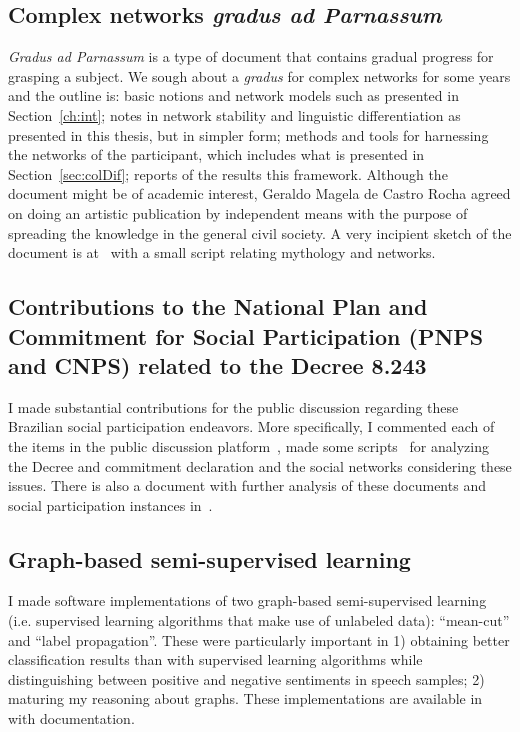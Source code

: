 \begin{apendicesenv}
\subsection{Complex networks \emph{gradus ad Parnassum}}
\emph{Gradus ad Parnassum} is a type of document that contains gradual progress for grasping a subject.
We sough about a \emph{gradus} for complex networks for some years and the outline is:
basic notions and network models such as presented in Section~\ref{ch:int};
notes in network stability and linguistic differentiation as presented in this thesis, but in simpler form;
methods and tools for harnessing the networks of the participant, which includes what is presented in Section~\ref{sec:colDif};
reports of the results this framework.
Although the document might be of academic interest,
Geraldo Magela de Castro Rocha agreed on doing an artistic publication by independent means
with the purpose of spreading the knowledge in the general civil society.
A very incipient sketch of the document is at~\cite{gradus}
with a small script relating mythology and networks.

\subsection{Contributions to the National Plan and Commitment for Social Participation (PNPS and CNPS) related to the Decree 8.243}
I made substantial contributions for the public discussion regarding these Brazilian social participation
endeavors.
More specifically, I commented each of the items in the public discussion platform~\cite{participaPNPS},
made some scripts~\cite{analisePNPS,pcPS} for analyzing the Decree and commitment declaration and the social networks considering these issues.
There is also a document with further analysis of these documents and social participation instances in~\cite{lmPS}.

\subsection{Graph-based semi-supervised learning}
I made software implementations of two graph-based semi-supervised learning
(i.e. supervised learning algorithms that make use of unlabeled data):
``mean-cut'' and ``label propagation''.
These were particularly important in 1) obtaining better classification results
than with supervised learning algorithms while distinguishing between positive
and negative sentiments in speech samples; 2) maturing my reasoning about graphs.
These implementations are available in~\cite{ssl} with documentation.


\end{apendicesenv}
